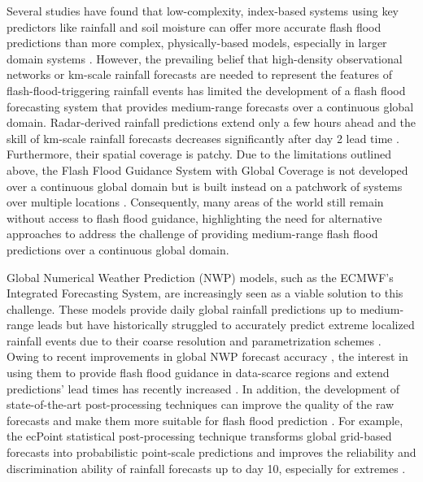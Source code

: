 \documentclass[techmemo]{ecmwfrep}%
\begin{document}
Several studies have found that low-complexity, index-based systems using key predictors like rainfall and soil moisture can offer more accurate flash flood predictions than more complex, physically-based models, especially in larger domain systems \citep{Alfieri2015a, Hurford2012, Luong2021, Ma2021, Raynaud2015, Zanchetta2022}. However, the prevailing belief that high-density observational networks \citep{Javelle2010} or km-scale rainfall forecasts \citep{Davolio2017, Song2019} are needed to represent the features of flash-flood-triggering rainfall events has limited the development of a flash flood forecasting system that provides medium-range forecasts over a continuous global domain. Radar-derived rainfall predictions extend only a few hours ahead \citep{Imhoff2022} and the skill of km-scale rainfall forecasts decreases significantly after day 2 lead time \cite{Barrett2019}. Furthermore, their spatial coverage is patchy. Due to the limitations outlined above, the Flash Flood Guidance System with Global Coverage is not developed over a continuous global domain but is built instead on a patchwork of systems over multiple locations \citep{Georgakakos2021}. Consequently, many areas of the world still remain without access to flash flood guidance, highlighting the need for alternative approaches to address the challenge of providing medium-range flash flood predictions over a continuous global domain.

Global Numerical Weather Prediction (NWP) models, such as the ECMWF's Integrated Forecasting System, are increasingly seen as a viable solution to this challenge. These models provide daily global rainfall predictions up to medium-range leads but have historically struggled to accurately predict extreme localized rainfall events due to their coarse resolution and parametrization schemes \citep{Emerton2016, Wen2021}. Owing to recent improvements in global NWP forecast accuracy \citep{Haiden2023, Lavers2021}, the interest in using them to provide flash flood guidance in data-scarce regions and extend predictions' lead times has recently increased \citep{Bucherie2022b}. In addition, the development of state-of-the-art post-processing techniques can improve the quality of the raw forecasts and make them more suitable for flash flood prediction \citep{Vannitsem2021}. For example, the ecPoint statistical post-processing technique transforms global grid-based forecasts into probabilistic point-scale predictions and improves the reliability and discrimination ability of rainfall forecasts up to day 10, especially for extremes \citep{Hewson2021}.
\end{document}
